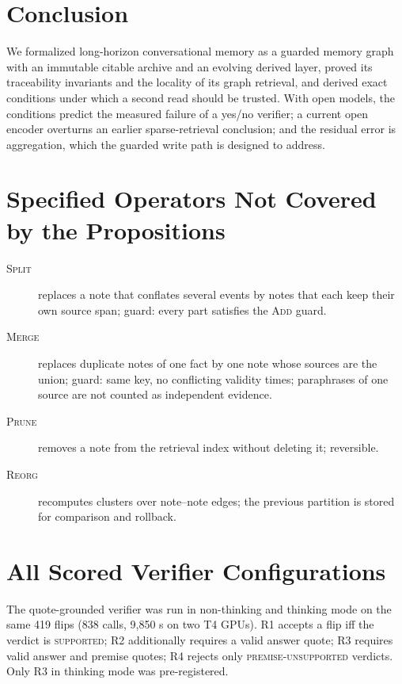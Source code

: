 \documentclass[10pt]{article}
\theoremstyle{plain}
\theoremstyle{definition}
\theoremstyle{remark}
\begin{document}
\section{Conclusion}

We formalized long-horizon conversational memory as a guarded memory graph with an
immutable citable archive and an evolving derived layer, proved its traceability
invariants and the locality of its graph retrieval, and derived exact conditions
under which a second read should be trusted. With open models, the conditions
predict the measured failure of a yes/no verifier; a current open encoder overturns
an earlier sparse-retrieval conclusion; and the residual error is aggregation,
which the guarded write path is designed to address.




\appendix

\section{Specified Operators Not Covered by the Propositions}
\label{app:ops}

\begin{description}
  \item[\textsc{Split}] replaces a note that conflates several events by notes that
  each keep their own source span; guard: every part satisfies the \textsc{Add} guard.
  \item[\textsc{Merge}] replaces duplicate notes of one fact by one note whose sources
  are the union; guard: same key, no conflicting validity times; paraphrases of one
  source are not counted as independent evidence.
  \item[\textsc{Prune}] removes a note from the retrieval index without deleting it;
  reversible.
  \item[\textsc{Reorg}] recomputes clusters over note--note edges; the previous
  partition is stored for comparison and rollback.
\end{description}

\section{All Scored Verifier Configurations}
\label{app:verifiers}

The quote-grounded verifier was run in non-thinking and thinking mode on the same
419 flips (838 calls, 9,850 s on two T4 GPUs). R1 accepts a flip iff the verdict is
\textsc{supported}; R2 additionally requires a valid answer quote; R3 requires valid
answer and premise quotes; R4 rejects only \textsc{premise-unsupported} verdicts.
Only R3 in thinking mode was pre-registered.
\end{document}
